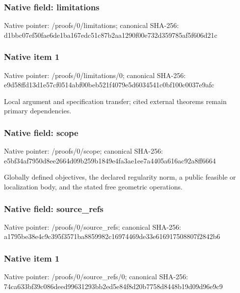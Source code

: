 \documentclass[10pt,a4paper]{article}
\begin{document}
\subsubsection{Native field: limitations}


Native pointer: /proofs/0/limitations; canonical SHA-256: d1bbc07ef50fae6de1ba167e\allowbreak{}dc51c87b2aa1290f00e732d3\allowbreak{}59785af5f606d21c



\subsubsection{Native item 1}


Native pointer: /proofs/0/limitations/0; canonical SHA-256: e9d58ffd13d1e57cf0514abf\allowbreak{}00beb521f4079e5d6034541c\allowbreak{}0bf100c0037e9afc


Local argument and specification transfer; cited external theorems remain primary dependencies.


\subsubsection{Native field: scope}


Native pointer: /proofs/0/scope; canonical SHA-256: e5bf34af7950d8ee2664d09b\allowbreak{}259b1849e4fa3ae1ee7a4405\allowbreak{}a616ac92a8ff6664


Globally defined objectives, the declared regularity norm, a public feasible or localization body, and the stated free geometric operations.


\subsubsection{Native field: source\_refs}


Native pointer: /proofs/0/source\_refs; canonical SHA-256: a1795be38e4c9c395f3571ba\allowbreak{}8859982c16974469de33e616\allowbreak{}917508807f2842b6



\subsubsection{Native item 1}


Native pointer: /proofs/0/source\_refs/0; canonical SHA-256: 74ca633bf39c086deed99631\allowbreak{}293bb2ed5e84f8d20b7758d8\allowbreak{}448b19d09d96e9c9
\end{document}

